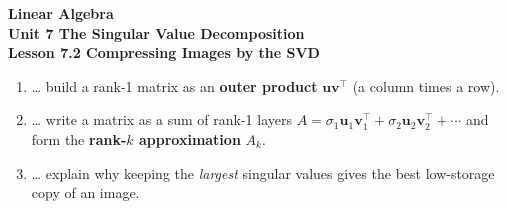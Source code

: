 \documentclass[10pt]{article}
\begin{document}
\vspace{-0.8in}

\begin{center}
  {\color{white}\textbf{\LARGE Linear Algebra}}\\[4pt]
  {\color{blushmid}\large\textbf{Unit 7 \quad The Singular Value Decomposition}}\\[6pt]
  {\color{white}\textbf{\large Lesson 7.2 \quad Compressing Images by the SVD}}
\end{center}

\vspace{0.22in}
\namedateperiod
\vspace{0.18in}

\begin{learningtargetbox}
\small
\begin{enumerate}[leftmargin=1.5em, itemsep=5pt]
  \item \ldots{} build a rank-1 matrix as an \textbf{outer product} $\mathbf{u}\mathbf{v}^{\top}$ (a column times a row).
  \item \ldots{} write a matrix as a sum of rank-1 layers $A=\sigma_1\mathbf{u}_1\mathbf{v}_1^{\top}+\sigma_2\mathbf{u}_2\mathbf{v}_2^{\top}+\cdots$ and form the \textbf{rank-$k$ approximation} $A_k$.
  \item \ldots{} explain why keeping the \emph{largest} singular values gives the best low-storage copy of an image.
\end{enumerate}
\end{learningtargetbox}

\vspace{0.14in}
\end{document}
